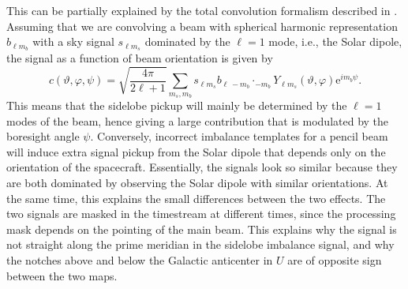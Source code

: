\documentclass[twocolumn]{aa}
\newcommand{\e}{\mathrm e}
\begin{document}
This can be partially explained by the total convolution formalism described
in \citet{bp08}. Assuming that we are convolving a beam with spherical harmonic
representation $b_{\ell m_b}$ with a sky signal $s_{\ell m_s}$ dominated by the
$\ell=1$ mode, i.e., the Solar dipole, the signal as a function of beam
orientation is given by 
\begin{equation}
	c(\vartheta,\varphi,\psi)=\sqrt{\frac{4\pi}{2\ell+1}}\sum_{m_s,m_b}
	s_{\ell m_s}b_{\ell\,-m_b}\cdot_{-m_b}Y_{\ell m_s}(\vartheta,\varphi)\e^{im_b\psi}.
\end{equation}
This means that the sidelobe pickup will mainly be determined by the $\ell=1$
modes of the beam, hence giving a large contribution that is modulated by the
boresight angle $\psi$. Conversely, incorrect imbalance templates for a pencil
beam will induce extra signal pickup from the Solar dipole that depends only on
the orientation of the spacecraft. Essentially, the signals look so similar
because they are both dominated by observing the Solar dipole with similar
orientations. At the same time, this explains the small differences between the two effects. 
The two signals are masked in the timestream at different times,
since the processing mask depends on the pointing of the main beam. This
explains why the signal is not straight along the prime meridian in the
sidelobe imbalance signal, and why the notches above and below the Galactic
anticenter in $U$ are of opposite sign between the two maps.
\end{document}
